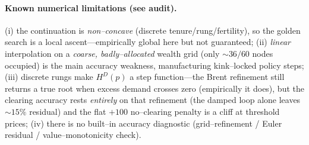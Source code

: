 \documentclass[11pt]{article}
\begin{document}
\paragraph{Known numerical limitations (see audit).} (i) the continuation is \emph{non--concave}
(discrete tenure/rung/fertility), so the golden search is a local ascent---empirically global here but
not guaranteed; (ii) \emph{linear} interpolation on a \emph{coarse, badly--allocated} wealth grid
(only $\sim\!36/60$ nodes occupied) is the main accuracy weakness, manufacturing kink--locked policy
steps; (iii) discrete rungs make $H^D(p)$ a step function---the Brent refinement still returns a true root
when excess demand crosses zero (empirically it does), but the clearing accuracy rests \emph{entirely} on
that refinement (the damped loop alone leaves $\sim\!15\%$ residual) and the flat $+100$ no--clearing
penalty is a cliff at threshold prices; (iv) there is no built--in accuracy diagnostic (grid--refinement /
Euler residual / value--monotonicity check).
\end{document}
